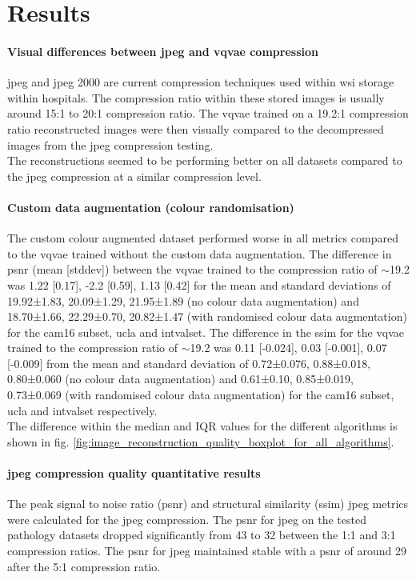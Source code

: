\documentclass[review]{elsarticle}
\begin{document}
\section{Results}
\paragraph{Visual differences between \gls{jpeg} and \gls{vqvae} compression} \gls{jpeg} and \gls{jpeg} 2000 are current compression techniques used within \gls{wsi} storage within hospitals. The compression ratio within these stored images is usually around 15:1 to 20:1 compression ratio. The \gls{vqvae} trained on a 19.2:1 compression ratio reconstructed images were then visually compared to the decompressed images from the \gls{jpeg} compression testing. \\
The reconstructions seemed to be performing better on all datasets compared to the \gls{jpeg} compression at a similar compression level.

\paragraph{Custom data augmentation (colour randomisation)}  The custom colour augmented dataset performed worse in all metrics compared to the \gls{vqvae} trained without the custom data augmentation. The difference in \gls{psnr} (\gls{mean} [\gls{stddev}]) between the \gls{vqvae} trained to the compression ratio of $\sim$19.2 was 1.22 [0.17], -2.2 [0.59], 1.13 [0.42] for the mean and standard deviations of 19.92±1.83, 20.09±1.29, 21.95±1.89 (no colour data augmentation) and 18.70±1.66, 22.29±0.70, 20.82±1.47 (with randomised colour data augmentation) for the \gls{cam16} subset, \gls{ucla} and \gls{intvalset}. The difference in the \gls{ssim} for the \gls{vqvae} trained to the compression ratio of $\sim$19.2 was 0.11 [-0.024], 0.03 [-0.001], 0.07 [-0.009] from the mean and standard deviation of 0.72±0.076, 0.88±0.018, 0.80±0.060 (no colour data augmentation) and 0.61±0.10, 0.85±0.019, 0.73±0.069 (with randomised colour data augmentation) for the \gls{cam16} subset, \gls{ucla} and \gls{intvalset} respectively. \\
The difference within the median and IQR values for the different algorithms is shown in fig. \ref{fig:image_reconstruction_quality_boxplot_for_all_algorithms}.

\paragraph{\gls{jpeg} compression quality quantitative results} The peak signal to noise ratio (\gls{psnr}) and structural similarity (\gls{ssim}) \gls{jpeg} metrics were calculated for the \gls{jpeg} compression. The \gls{psnr} for \gls{jpeg} on the tested pathology datasets dropped significantly from 43 to 32 between the 1:1 and 3:1 compression ratios. The \gls{psnr} for \gls{jpeg} maintained stable with a \gls{psnr} of around 29 after the 5:1 compression ratio.
\end{document}

